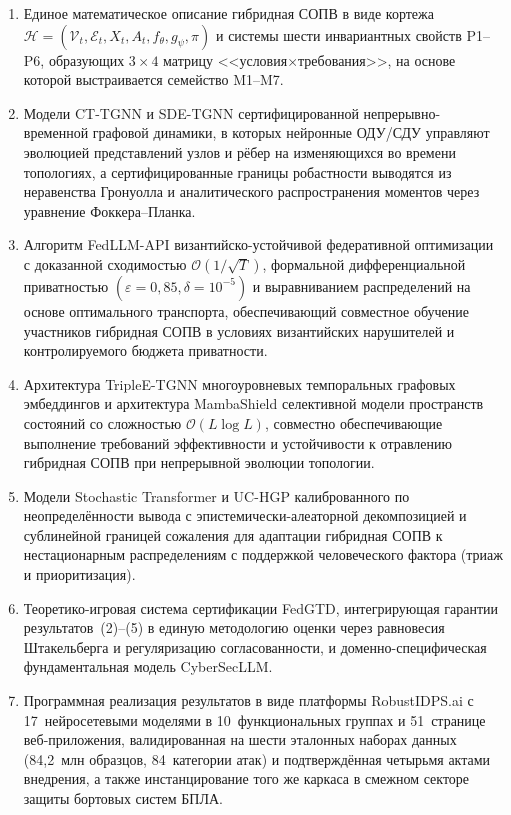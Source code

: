 \documentclass[12pt,a5paper]{article}
\begin{document}
\begin{enumerate}
\item Единое математическое описание гибридная СОПВ в виде
кортежа $\mathcal{H} = (\mathcal{V}_t, \mathcal{E}_t, X_t, A_t,
f_\theta, g_\psi, \pi)$ и системы шести инвариантных свойств
P1--P6, образующих $3\times4$ матрицу
<<условия$\times$требования>>, на основе которой выстраивается
семейство M1--M7.

\item Модели CT-TGNN и SDE-TGNN сертифицированной
непрерывно-временной графовой динамики, в которых нейронные
ОДУ/СДУ управляют эволюцией представлений узлов и рёбер на
изменяющихся во времени топологиях, а сертифицированные границы
робастности выводятся из неравенства Гронуолла и аналитического
распространения моментов через уравнение Фоккера--Планка.

\item Алгоритм FedLLM-API византийско-устойчивой федеративной
оптимизации с доказанной сходимостью $\mathcal{O}(1/\sqrt{T})$,
формальной дифференциальной приватностью
$(\varepsilon{=}0{,}85,\delta{=}10^{-5})$ и выравниванием
распределений на основе оптимального транспорта, обеспечивающий
совместное обучение участников гибридная СОПВ в условиях
византийских нарушителей и контролируемого бюджета приватности.

\item Архитектура TripleE-TGNN многоуровневых темпоральных
графовых эмбеддингов и архитектура MambaShield селективной
модели пространств состояний со сложностью $\mathcal{O}(L\log L)$,
совместно обеспечивающие выполнение требований эффективности
и устойчивости к отравлению гибридная СОПВ при непрерывной
эволюции топологии.

\item Модели Stochastic Transformer и UC-HGP калиброванного
по неопределённости вывода с эпистемически-алеаторной
декомпозицией и сублинейной границей сожаления для адаптации
гибридная СОПВ к нестационарным распределениям с поддержкой
человеческого фактора (триаж и приоритизация).

\item Теоретико-игровая система сертификации FedGTD,
интегрирующая гарантии результатов~(2)--(5) в единую методологию
оценки через равновесия Штакельберга и регуляризацию
согласованности, и доменно-специфическая фундаментальная
модель CyberSecLLM.

\item Программная реализация результатов в виде платформы
RobustIDPS.ai с 17~нейросетевыми моделями в 10~функциональных
группах и 51~странице веб-приложения, валидированная на шести
эталонных наборах данных (84,2~млн образцов, 84~категории атак)
и подтверждённая четырьмя актами внедрения, а также
инстанцирование того же каркаса в смежном секторе защиты
бортовых систем БПЛА.
\end{enumerate}
\end{document}
